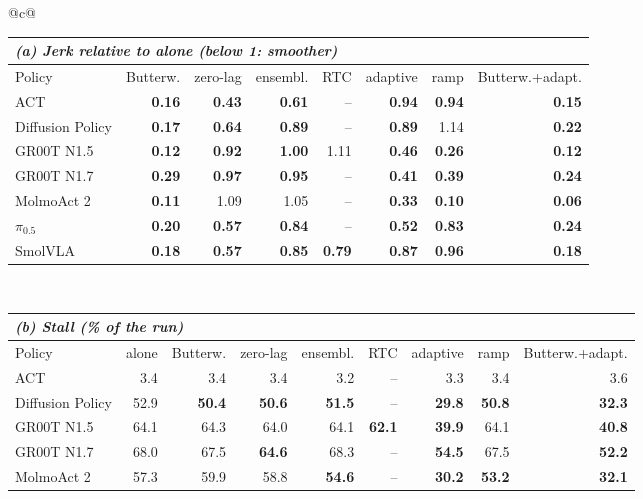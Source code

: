 \begin{tabular}{@{}c@{}}
\begin{tabular}{l rrrrrrr}
\toprule
\multicolumn{8}{l}{\textit{(a) Jerk relative to \drtc{} alone (below 1: smoother)}} \\
\midrule
Policy & Butterw. & zero-lag & ensembl. & RTC & adaptive & ramp & Butterw.+adapt. \\
\midrule
ACT & \textbf{0.16} & \textbf{0.43} & \textbf{0.61} & -- & \textbf{0.94} & \textbf{0.94} & \textbf{0.15} \\
Diffusion Policy & \textbf{0.17} & \textbf{0.64} & \textbf{0.89} & -- & \textbf{0.89} & 1.14 & \textbf{0.22} \\
GR00T N1.5 & \textbf{0.12} & \textbf{0.92} & \textbf{1.00} & 1.11 & \textbf{0.46} & \textbf{0.26} & \textbf{0.12} \\
GR00T N1.7 & \textbf{0.29} & \textbf{0.97} & \textbf{0.95} & -- & \textbf{0.41} & \textbf{0.39} & \textbf{0.24} \\
MolmoAct 2 & \textbf{0.11} & 1.09 & 1.05 & -- & \textbf{0.33} & \textbf{0.10} & \textbf{0.06} \\
$\pi_{0.5}$ & \textbf{0.20} & \textbf{0.57} & \textbf{0.84} & -- & \textbf{0.52} & \textbf{0.83} & \textbf{0.24} \\
SmolVLA & \textbf{0.18} & \textbf{0.57} & \textbf{0.85} & \textbf{0.79} & \textbf{0.87} & \textbf{0.96} & \textbf{0.18} \\
\bottomrule
\end{tabular}
\\[8pt]
\begin{tabular}{l rrrrrrrr}
\toprule
\multicolumn{9}{l}{\textit{(b) Stall (\% of the run)}} \\
\midrule
Policy & \drtc{} alone & Butterw. & zero-lag & ensembl. & RTC & adaptive & ramp & Butterw.+adapt. \\
\midrule
ACT & 3.4 & 3.4 & 3.4 & 3.2 & -- & 3.3 & 3.4 & 3.6 \\
Diffusion Policy & 52.9 & \textbf{50.4} & \textbf{50.6} & \textbf{51.5} & -- & \textbf{29.8} & \textbf{50.8} & \textbf{32.3} \\
GR00T N1.5 & 64.1 & 64.3 & 64.0 & 64.1 & \textbf{62.1} & \textbf{39.9} & 64.1 & \textbf{40.8} \\
GR00T N1.7 & 68.0 & 67.5 & \textbf{64.6} & 68.3 & -- & \textbf{54.5} & 67.5 & \textbf{52.2} \\
MolmoAct 2 & 57.3 & 59.9 & 58.8 & \textbf{54.6} & -- & \textbf{30.2} & \textbf{53.2} & \textbf{32.1} \\

\end{tabular}
\end{tabular}
